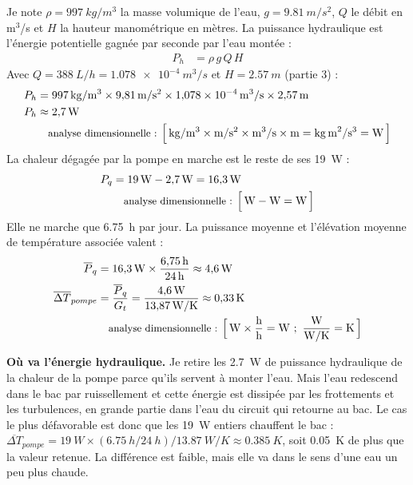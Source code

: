 \begin{demonstration}
Je note $\rho = \qty{997}{kg/m^3}$ la masse volumique de l'eau, $g = \qty{9,81}{m/s^2}$, $Q$ le débit en m$^3$/s et $H$ la hauteur manométrique en mètres. La puissance hydraulique est l'énergie potentielle gagnée par seconde par l'eau montée :
\begin{align*}
P_h &= \rho\,g\,Q\,H
\end{align*}
Avec $Q = \qty{388}{L/h} = \qty{1,078e-4}{m^3/s}$ et $H = \qty{2,57}{m} $ (partie 3) :
\begin{align*}
P_h &= \qty{997}{kg/m^3} \times \qty{9,81}{m/s^2} \times \qty{1,078e-4}{m^3/s} \times \qty{2,57}{m}\\
P_h &\approx \qty{2,7}{W}\\
\dimline{\unit{kg/m^3}\times\unit{m/s^2}\times\unit{m^3/s}\times\unit{m}=\unit{kg\,m^2/s^3}=\unit{W}}
\end{align*}
La chaleur dégagée par la pompe en marche est le reste de ses \qty{19}{W} :
\begin{align*}
P_{q} &= \qty{19}{W} - \qty{2,7}{W} = \qty{16,3}{W}\\
\dimline{\unit{W}-\unit{W}=\unit{W}}
\end{align*}
Elle ne marche que \qty{6,75}{h} par jour. La puissance moyenne et l'élévation moyenne de température associée valent :
\begin{align*}
\overline{P}_q &= \qty{16,3}{W} \times \frac{\qty{6,75}{h}}{\qty{24}{h}} \approx \qty{4,6}{W}\\
\overline{\Delta T}_{pompe} &= \frac{\overline{P}_q}{G_t} = \frac{\qty{4,6}{W}}{\qty{13,87}{W/K}} \approx \qty{0,33}{K}\\
\dimline{\unit{W}\times\dfrac{\unit{h}}{\unit{h}}=\unit{W}\ ;\ \dfrac{\unit{W}}{\unit{W/K}}=\unit{K}}
\end{align*}
\end{demonstration}


\textbf{Où va l'énergie hydraulique.} Je retire les \qty{2,7}{W} de puissance hydraulique de la chaleur de la pompe parce qu'ils servent à monter l'eau. Mais l'eau redescend dans le bac par ruissellement et cette énergie est dissipée par les frottements et les turbulences, en grande partie dans l'eau du circuit qui retourne au bac. Le cas le plus défavorable est donc que les \qty{19}{W} entiers chauffent le bac : $\overline{\Delta T}_{pompe} = \qty{19}{W} \times (\qty{6,75}{h}/\qty{24}{h}) / \qty{13,87}{W/K} \approx \qty{0,385}{K}$, soit \qty{0,05}{K} de plus que la valeur retenue. La différence est faible, mais elle va dans le sens d'une eau un peu plus chaude.

